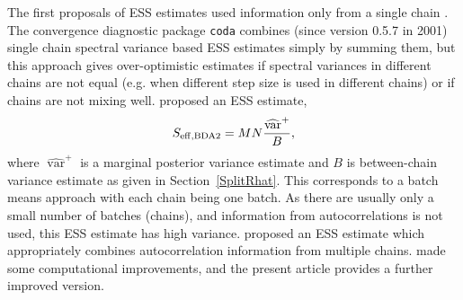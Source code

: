 \documentclass[american,]{article}
\DeclareMathOperator{\var}{var}
\DeclareMathOperator{\E}{E}
\theoremstyle{definition}
\begin{document}
The first proposals of ESS estimates  used information only from
a single chain \citep[see, e.g.][]{Sorensen+etal:1995}. The convergence
diagnostic package \texttt{coda} \citep{coda2006} combines (since
version 0.5.7 in 2001) single chain spectral variance based ESS
estimates simply by summing them, but this approach gives
over-optimistic estimates if spectral variances in different chains
are not equal (e.g. when different step size is used in different
chains) or if chains are not mixing well.  \citet{BDA2} proposed an
ESS estimate,
\begin{equation}
S_{\rm eff,BDA2} = MN\frac{\widehat{\var}^{+}}{B},
\end{equation}
where $\widehat{\var}^+$ is a marginal posterior variance
estimate and $B$ is between-chain variance estimate as given in
Section~\ref{SplitRhat}.  This corresponds to a batch means approach
with each chain being one batch. As there are usually only a small
number of batches (chains), and information from autocorrelations is
not used, this ESS estimate has high variance.
%
\citet{BDA3} proposed an ESS estimate which appropriately combines
autocorrelation information from multiple chains. \citet{StanManual.2.18.0} made some computational
improvements, and the present article provides a further improved version.


\end{document}
